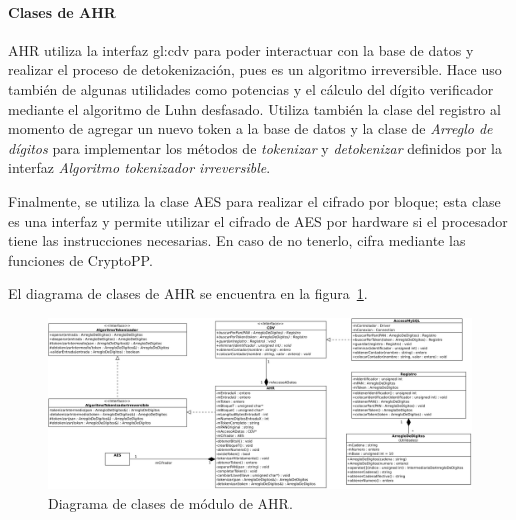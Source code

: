 %
%
%

\paragraph{Clases de AHR}

AHR utiliza la interfaz \acrshort{gl:cdv} para poder interactuar con la base de
datos y realizar el proceso de detokenización, pues es un algoritmo
irreversible. Hace uso también de algunas utilidades como potencias y
el cálculo del dígito verificador mediante el algoritmo de Luhn desfasado.
Utiliza también la clase del registro al momento de agregar un nuevo token
a la base de datos y la clase de \textit{Arreglo de dígitos} para implementar
los métodos de \textit{tokenizar} y \textit{detokenizar} definidos por la
interfaz \textit{Algoritmo tokenizador irreversible}.

Finalmente, se utiliza la clase AES para realizar el cifrado por bloque; esta
clase es una interfaz y permite utilizar el cifrado de AES por hardware si
el procesador tiene las instrucciones necesarias. En caso de no tenerlo,
cifra mediante las funciones de CryptoPP.

El diagrama de clases de AHR se encuentra en la figura~\ref{clases_ahr}.
\begin{figure}
  \begin{center}
    \includegraphics[width=1.0\linewidth]{diagramas/ahr.png}
    \caption{Diagrama de clases de módulo de AHR.}
    \label{clases_ahr}
  \end{center}
\end{figure}
